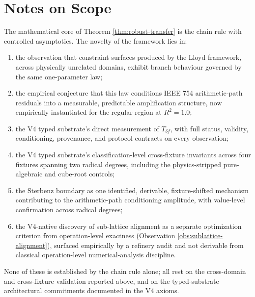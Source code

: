\documentclass[11pt,a4paper]{article}
\begin{document}
\section{Notes on Scope}

The mathematical core of Theorem \ref{thm:robust-transfer} is the chain rule with controlled asymptotics. The novelty of the framework lies in:
\begin{enumerate}
    \item the observation that constraint surfaces produced by the Lloyd framework, across physically unrelated domains, exhibit branch behaviour governed by the same one-parameter law;
    \item the empirical conjecture that this law conditions IEEE 754 arithmetic-path residuals into a measurable, predictable amplification structure, now empirically instantiated for the regular region at $R^2 = 1.0$;
    \item the V4 typed substrate's direct measurement of $T_{\delta f}$, with full status, validity, conditioning, provenance, and protocol contracts on every observation;
    \item the V4 typed substrate's classification-level cross-fixture invariants across four fixtures spanning two radical degrees, including the physics-stripped pure-algebraic and cube-root controls;
    \item the Sterbenz boundary as one identified, derivable, fixture-shifted mechanism contributing to the arithmetic-path conditioning amplitude, with value-level confirmation across radical degrees;
    \item the V4-native discovery of sub-lattice alignment as a separate optimization criterion from operation-level exactness (Observation \ref{obs:sublattice-alignment}), surfaced empirically by a refinery audit and not derivable from classical operation-level numerical-analysis discipline.
\end{enumerate}
None of these is established by the chain rule alone; all rest on the cross-domain and cross-fixture validation reported above, and on the typed-substrate architectural commitments documented in the V4 axioms.
\end{document}
